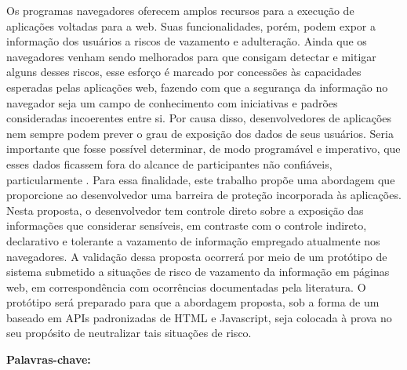 \newpage
\begin{resumo}
\normalsize

Os programas navegadores oferecem amplos recursos para a execução de aplicações voltadas para a web. Suas funcionalidades, porém, podem expor a informação dos usuários a riscos de vazamento e adulteração. Ainda que os navegadores venham sendo melhorados para que consigam detectar e mitigar alguns desses riscos, esse esforço é marcado por concessões às capacidades esperadas pelas aplicações web, fazendo com que a segurança da informação no navegador seja um campo de conhecimento com iniciativas e padrões consideradas incoerentes entre si. Por causa disso, desenvolvedores de aplicações nem sempre podem prever o grau de exposição dos dados de seus usuários.
Seria importante que fosse possível determinar, de modo programável e imperativo, que esses dados ficassem fora do alcance de participantes não confiáveis, particularmente {\scripts}.
Para essa finalidade, este trabalho propõe uma abordagem que proporcione ao desenvolvedor uma barreira de proteção incorporada às aplicações. Nesta proposta, o desenvolvedor tem controle direto sobre a exposição das informações que considerar sensíveis, em contraste com o controle indireto, declarativo e tolerante a vazamento de informação empregado atualmente nos navegadores.
A validação dessa proposta ocorrerá por meio de um protótipo de sistema submetido a situações de risco de vazamento da informação em páginas web, em correspondência com ocorrências documentadas pela literatura. O protótipo será preparado para que a abordagem proposta, sob a forma de um {\script} baseado em APIs padronizadas de HTML e Javascript, seja colocada à prova no seu propósito de neutralizar tais situações de risco.


\vspace{\onelineskip}

\noindent
\textbf{Palavras-chave:} \imprimirpalavraschave
\end{resumo}

